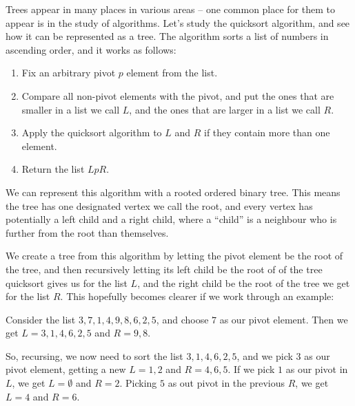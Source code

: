 \documentclass[nobib]{tufte-handout}
\begin{document}
\begin{example}
  Trees appear in many places in various areas -- one common place for them to appear is in the study of algorithms. Let's study the quicksort algorithm, and see how it can be represented as a tree. The algorithm sorts a list of numbers in ascending order, and it works as follows:
  \begin{enumerate}
    \item Fix an arbitrary pivot $p$ element from the list.
    \item Compare all non-pivot elements with the pivot, and put the ones that are smaller in a list we call $L$, and the ones that are larger in a list we call $R$.
    \item Apply the quicksort algorithm to $L$ and $R$ if they contain more than one element.
    \item Return the list $LpR$.
  \end{enumerate}

  We can represent this algorithm with a rooted ordered binary tree. This means the tree has one designated vertex we call the root, and every vertex has potentially a left child and a right child, where a ``child'' is a neighbour who is further from the root than themselves.

  We create a tree from this algorithm by letting the pivot element be the root of the tree, and then recursively letting its left child be the root of of the tree quicksort gives us for the list $L$, and the right child be the root of the tree we get for the list $R$. This hopefully becomes clearer if we work through an example:

  Consider the list $3,7,1,4,9,8,6,2,5$, and choose $7$ as our pivot element. Then we get $L = 3,1,4,6,2,5$ and $R = 9,8$.

  So, recursing, we now need to sort the list $3,1,4,6,2,5$, and we pick $3$ as our pivot element, getting a new $L = 1,2$ and $R = 4,6,5$. If we pick $1$ as our pivot in $L$, we get $L = \emptyset$ and $R = 2$. Picking $5$ as out pivot in the previous $R$, we get $L = 4$ and $R = 6$.


\end{example}
\end{document}
